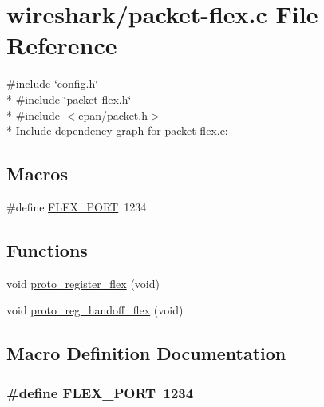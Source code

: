 \hypertarget{packet-flex_8c}{}\section{wireshark/packet-\/flex.c File Reference}
\label{packet-flex_8c}
{\ttfamily \#include \char`\"{}config.\+h\char`\"{}}\\*
{\ttfamily \#include \char`\"{}packet-\/flex.\+h\char`\"{}}\\*
{\ttfamily \#include $<$epan/packet.\+h$>$}\\*
Include dependency graph for packet-\/flex.c\+:
\subsection*{Macros}
\begin{DoxyCompactItemize}
\item 
\#define \hyperlink{packet-flex_8c_a265ee584aaf9996ff543e47db3bf8886}{F\+L\+E\+X\+\_\+\+P\+O\+RT}~1234
\end{DoxyCompactItemize}
\subsection*{Functions}
\begin{DoxyCompactItemize}
\item 
void \hyperlink{packet-flex_8c_a246038db8f6de9947d3193425cf4e569}{proto\+\_\+register\+\_\+flex} (void)
\item 
void \hyperlink{packet-flex_8c_afee211089012feba32db8867206d2c75}{proto\+\_\+reg\+\_\+handoff\+\_\+flex} (void)
\end{DoxyCompactItemize}


\subsection{Macro Definition Documentation}
\subsubsection[{\texorpdfstring{F\+L\+E\+X\+\_\+\+P\+O\+RT}{FLEX_PORT}}]{\setlength{\rightskip}{0pt plus 5cm}\#define F\+L\+E\+X\+\_\+\+P\+O\+RT~1234}\hypertarget{packet-flex_8c_a265ee584aaf9996ff543e47db3bf8886}{}\label{packet-flex_8c_a265ee584aaf9996ff543e47db3bf8886}


